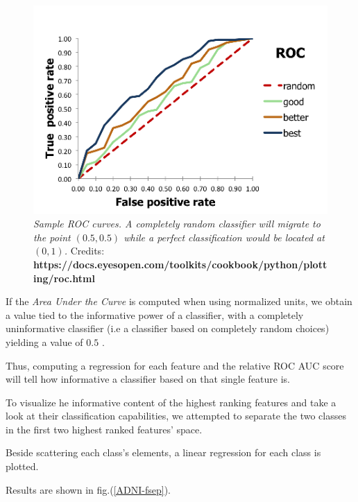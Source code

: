 \documentclass[12pt,openright,twoside,a4paper]{book}
\begin{document}
\begin{figure}[!h]
\centering
\includegraphics[scale=0.5]{roc-theory-small}
\caption{\textit{Sample ROC curves. A completely random classifier will migrate to the point $(0.5,0.5)$ while a perfect classification would be located at $(0,1)$.}
Credits: \textbf{https://docs.eyesopen.com/toolkits/cookbook/python/plotting/roc.html}}
\label{ADNI-roc}
\end{figure}

If the \textit{Area Under the Curve} is computed when using normalized units, we obtain a value tied to the informative power of a classifier, with a completely uninformative classifier (i.e a classifier based on completely random choices) yielding a value of $0.5$ \cite{ROC}.
\vspace{5mm}

Thus, computing a regression for each feature and the relative ROC AUC score will tell how informative a classifier based on that single feature is. 

To visualize he informative content of the highest ranking features and take a look at their classification capabilities, we attempted to separate the two classes in the first two highest ranked features' space.

Beside scattering each class's elements, a linear regression for each class is plotted.

Results are shown in fig.(\ref{ADNI-fsep}).
\end{document}
